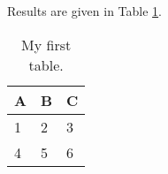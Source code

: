 \label{chapter:methodology}

\Blindtext [1] Results are given in Table \ref{tab:my-table}.

\begin{table}[!h]
\centering
\caption{My first table.}
\label{tab:my-table}
\begin{tabular}{lll}
\hline
A & B & C \\ \hline
1 & 2 & 3 \\
4 & 5 & 6 \\ \hline
\end{tabular}%
\end{table}

\Blindtext [1]
\Blindtext [1]